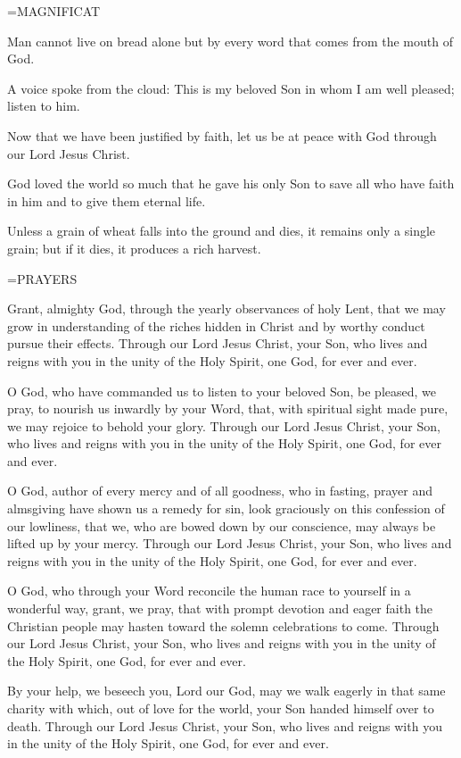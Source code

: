 \hangindent=\parindent \small MAGNIFICAT
\begin{description}[labelindent=\parindent, noitemsep, leftmargin=*]
\item [Week 1:] 	Man cannot live on bread alone but by every word that comes from the mouth of God.
\item [Week 2:] 	A voice spoke from the cloud: This is my beloved Son in whom I am well pleased; listen to him.
\item [Week 3:] 	Now that we have been justified by faith, let us be at peace with God through our Lord Jesus Christ.
\item [Week 4:] 	God loved the world so much that he gave his only Son to save all who have faith in him and to give them eternal life.
\item [Week 5:] 	Unless a grain of wheat falls into the ground and dies, it remains only a single grain; but if it dies, it produces a rich harvest.
\end{description}

\hangindent=\parindent \small PRAYERS
\begin{description}[labelindent=\parindent, noitemsep, leftmargin=*]
\item [Week 1:] 	Grant, almighty God, through the yearly observances of holy Lent, that we may grow in understanding of the riches hidden in Christ and by worthy conduct pursue their effects. Through our Lord Jesus Christ, your Son, who lives and reigns with you in the unity of the Holy Spirit, one God, for ever and ever.
\item [Week 2:] 	O God, who have commanded us to listen to your beloved Son, be pleased, we pray, to nourish us inwardly by your Word, that, with spiritual sight made pure, we may rejoice to behold your glory. Through our Lord Jesus Christ, your Son, who lives and reigns with you in the unity of the Holy Spirit, one God, for ever and ever.
\item [Week 3:] 	O God, author of every mercy and of all goodness, who in fasting, prayer and almsgiving have shown us a remedy for sin, look graciously on this confession of our lowliness, that we, who are bowed down by our conscience, may always be lifted up by your mercy. Through our Lord Jesus Christ, your Son, who lives and reigns with you in the unity of the Holy Spirit, one God, for ever and ever.
\item [Week 4:] 	O God, who through your Word reconcile the human race to yourself in a wonderful way, grant, we pray, that with prompt devotion and eager faith the Christian people may hasten toward the solemn celebrations to come. Through our Lord Jesus Christ, your Son, who lives and reigns with you in the unity of the Holy Spirit, one God, for ever and ever.
\item [Week 5:] 	By your help, we beseech you, Lord our God, may we walk eagerly in that same charity with which, out of love for the world, your Son handed himself over to death. Through our Lord Jesus Christ, your Son, who lives and reigns with you in the unity of the Holy Spirit, one God, for ever and ever.
\end{description}

